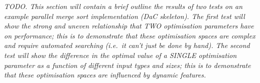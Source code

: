 \textit{TODO. This section will contain a brief outline the results of
two tests on an example parallel merge sort implementation (DaC
skeleton). The first test will show the strong and uneven relationship
that TWO optimisation parameters have on performance; this is to
demonstrate that these optimisation spaces are complex and require
automated searching (i.e.\ it can't just be done by hand). The second
test will show the difference in the optimal value of a SINGLE
optimisation parameter as a function of different input types and
sizes; this is to demonstrate that these optimisation spaces are
influenced by dynamic features.}




